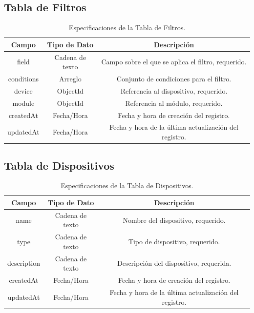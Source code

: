 \subsection{Tabla de Filtros}
\begin{table}[h!]
    \centering
    \begin{tabular}{|c|c|c|}
    \hline
    \rowcolor[HTML]{FCE8B2} 
    \textbf{Campo} & \textbf{Tipo de Dato} & \textbf{Descripción} \\ \hline
    field & Cadena de texto & Campo sobre el que se aplica el filtro, requerido. \\ \hline
    conditions & Arreglo & Conjunto de condiciones para el filtro. \\ \hline
    device & ObjectId & Referencia al dispositivo, requerido. \\ \hline
    module & ObjectId & Referencia al módulo, requerido. \\ \hline
    createdAt & Fecha/Hora & Fecha y hora de creación del registro. \\ \hline
    updatedAt & Fecha/Hora & Fecha y hora de la última actualización del registro. \\ \hline
    \end{tabular}
    \caption{Especificaciones de la Tabla de Filtros.}
\end{table}

\subsection{Tabla de Dispositivos}
\begin{table}[h!]
    \centering
    \begin{tabular}{|c|c|c|}
    \hline
    \rowcolor[HTML]{FCE8B2} 
    \textbf{Campo} & \textbf{Tipo de Dato} & \textbf{Descripción} \\ \hline
    name & Cadena de texto & Nombre del dispositivo, requerido. \\ \hline
    type & Cadena de texto & Tipo de dispositivo, requerido. \\ \hline
    description & Cadena de texto & Descripción del dispositivo, requerida. \\ \hline
    createdAt & Fecha/Hora & Fecha y hora de creación del registro. \\ \hline
    updatedAt & Fecha/Hora & Fecha y hora de la última actualización del registro. \\ \hline
    \end{tabular}
    \caption{Especificaciones de la Tabla de Dispositivos.}
\end{table}

